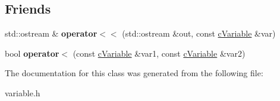 \subsection*{Friends}
\begin{DoxyCompactItemize}
\item 
\hypertarget{classcVariable_a3034b14850c7625c876745e81621d1d0}{std\-::ostream \& {\bfseries operator$<$$<$} (std\-::ostream \&out, const \hyperlink{classcVariable}{c\-Variable} \&var)}\label{classcVariable_a3034b14850c7625c876745e81621d1d0}

\item 
\hypertarget{classcVariable_abc14a2b8ae3ded30b9b431746164e8a1}{bool {\bfseries operator$<$} (const \hyperlink{classcVariable}{c\-Variable} \&var1, const \hyperlink{classcVariable}{c\-Variable} \&var2)}\label{classcVariable_abc14a2b8ae3ded30b9b431746164e8a1}

\end{DoxyCompactItemize}


The documentation for this class was generated from the following file\-:\begin{DoxyCompactItemize}
\item 
variable.\-h\end{DoxyCompactItemize}
